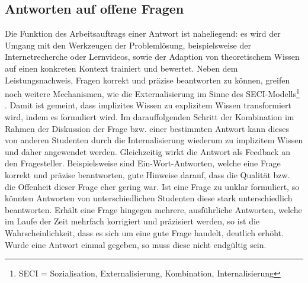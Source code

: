 \subsection{Antworten auf offene Fragen}
Die Funktion des Arbeitsauftrags einer Antwort ist naheliegend: es wird der Umgang mit den Werkzeugen der Problemlösung, beispielsweise der Internetrecherche oder Lernvideos, sowie der Adaption von theoretischem Wissen auf einen konkreten Kontext trainiert und bewertet. Neben dem Leistungsnachweis, Fragen korrekt und präzise beantworten zu können, greifen noch weitere Mechanismen, wie die Externalisierung im Sinne des SECI-Modells\footnote{SECI = Sozialisation, Externalisierung, Kombination, Internalisierung} \cite{Nonaka1997}. Damit ist gemeint, dass implizites Wissen zu explizitem Wissen transformiert wird, indem es formuliert wird. Im darauffolgenden Schritt der Kombination im Rahmen der Diskussion der Frage bzw. einer bestimmten Antwort kann dieses von anderen Studenten durch die Internalisierung wiederum zu implizitem Wissen und daher angewendet werden. Gleichzeitig wirkt die Antwort als Feedback an den Fragesteller. Beispielsweise sind Ein-Wort-Antworten, welche eine Frage korrekt und präzise beantworten, gute Hinweise darauf, dass die Qualität bzw. die Offenheit dieser Frage eher gering war. Ist eine Frage zu unklar formuliert, so könnten Antworten von unterschiedlichen Studenten diese stark unterschiedlich beantworten. Erhält eine Frage hingegen mehrere, ausführliche Antworten, welche im Laufe der Zeit mehrfach korrigiert und präzisiert werden, so ist die Wahrscheinlichkeit, dass es sich um eine gute Frage handelt, deutlich erhöht. Wurde eine Antwort einmal gegeben, so muss diese nicht endgültig sein.

